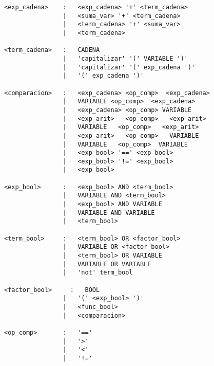\begin{verbatim}
<exp_cadena>    :   <exp_cadena> '+' <term_cadena>
                |   <suma_var> '+' <term_cadena>
                |   <term_cadena> '+' <suma_var>
                |   <term_cadena> 

<term_cadena>   :   CADENA
                |   'capitalizar' '(' VARIABLE ')'
                |   'capitalizar' '(' exp_cadena ')'
                |   '(' exp_cadena ')'

<comparacion>   :   <exp_cadena> <op_comp>  <exp_cadena>
                |   VARIABLE <op_comp>  <exp_cadena>
                |   <exp_cadena> <op_comp> VARIABLE 
                |   <exp_arit>   <op_comp>   <exp_arit>
                |   VARIABLE   <op_comp>   <exp_arit>
                |   <exp_arit>   <op_comp>   VARIABLE
                |   VARIABLE   <op_comp>  VARIABLE 
                |   <exp_bool> '==' <exp_bool>
                |   <exp_bool> '!=' <exp_bool>
                |   <exp_bool>

<exp_bool>      :   <exp_bool> AND <term_bool>
                |   VARIABLE AND <term_bool>
                |   <exp_bool> AND VARIABLE
                |   VARIABLE AND VARIABLE
                |   <term_bool>

<term_bool>     :   <term_bool> OR <factor_bool>
                |   VARIABLE OR <factor_bool>
                |   <term_bool> OR VARIABLE
                |   VARIABLE OR VARIABLE
                |   'not' term_bool

<factor_bool>     :   BOOL
                |   '(' <exp_bool> ')'
                |   <func_bool>
                |   <comparacion>

<op_comp>       :   '=='
                |   '>'
                |   '<'
                |   '!='


    
\end{verbatim}
